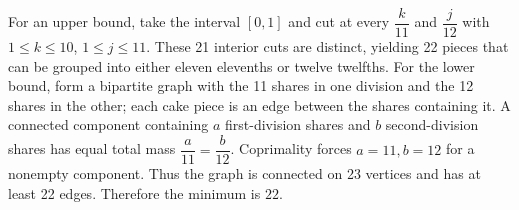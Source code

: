 For an upper bound, take the interval $[0,1]$ and cut at every $\dfrac{k}{11}$ and $\dfrac{j}{12}$ with $1\le k\le10$, $1\le j\le11$. These 21 interior cuts are distinct, yielding 22 pieces that can be grouped into either eleven elevenths or twelve twelfths. For the lower bound, form a bipartite graph with the 11 shares in one division and the 12 shares in the other; each cake piece is an edge between the shares containing it. A connected component containing $a$ first-division shares and $b$ second-division shares has equal total mass $\dfrac{a}{11}=\dfrac{b}{12}$. Coprimality forces $a=11,b=12$ for a nonempty component. Thus the graph is connected on 23 vertices and has at least 22 edges. Therefore the minimum is $\boxed{22}$.
